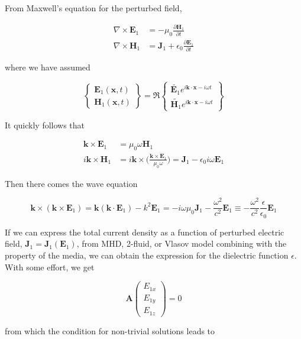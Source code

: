 \documentclass[
  notoc %
]{tufte-book}
\begin{document}
From Maxwell's equation for the perturbed field,

\[
\begin{aligned}
\nabla\times\mathbf{E}_1 &= -\mu_0\frac{\partial \mathbf{H}_1}{\partial t} \\
\nabla\times\mathbf{H}_1 &= \mathbf{J}_1 +\epsilon_0\frac{\partial \mathbf{E}_1}{\partial t}
\end{aligned}
\]

where we have assumed

\[
\begin{Bmatrix}
\mathbf{E}_1(\mathbf{x},t) \\ \mathbf{H}_1(\mathbf{x},t)
\end{Bmatrix}  = \Re
\begin{Bmatrix}
\tilde{\mathbf{E}_1}e^{i\mathbf{k}\cdot\mathbf{x}-i\omega t} \\
\tilde{\mathbf{H}_1}e^{i\mathbf{k}\cdot\mathbf{x}-i\omega t}
\end{Bmatrix}
\]

It quickly follows that

\[
\begin{aligned}
\mathbf{k}\times\mathbf{E}_1 &= \mu_0 \omega \mathbf{H}_1 \\
i\mathbf{k}\times\mathbf{H}_1 &= i\mathbf{k}\times\Big( \frac{\mathbf{k}\times\mathbf{E}_1}{\mu_0 \omega}\Big) = \mathbf{J}_1 - \epsilon_0 i\omega\mathbf{E}_1
\end{aligned}
\]

Then there comes the wave equation

\[
\mathbf{k}\times(\mathbf{k}\times\mathbf{E}_1) = \mathbf{k}(\mathbf{k}\cdot\mathbf{E}_1) - k^2\mathbf{E}_1 =  -i\omega \mu_0 \mathbf{J}_1 -\frac{\omega^2}{c^2}\mathbf{E}_1 \equiv -\frac{\omega^2}{c^2}\frac{\epsilon}{\epsilon_0}\mathbf{E}_1
\]

If we can express the total current density as a function of perturbed
electric field, \(\mathbf{J}_1 = \mathbf{J}_1(\mathbf{E}_1)\), from MHD,
2-fluid, or Vlasov model combining with the property of the media, we
can obtain the expression for the dielectric function \(\epsilon\). With
some effort, we get

\[
\mathbf{A}
\begin{pmatrix}
E_{1x} \\ E_{1y} \\ E_{1z}
\end{pmatrix} = 0
\]

from which the condition for non-trivial solutions leads to
\end{document}
